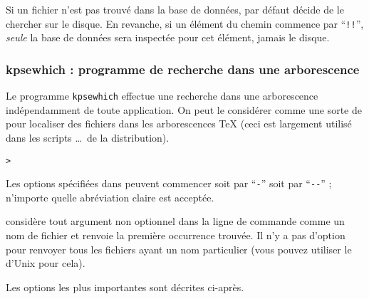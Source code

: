 \documentclass[german, english, french]{article}
\renewcommand{\samp}[1]{\enquote{\texttt{#1}}}
\begin{document}
Si un fichier n'est pas trouvé dans la base de données, par défaut \KPS{} décide
de le chercher sur le disque. En revanche, si un élément du chemin commence par
\samp{!!}, \emph{seule} la base de données sera inspectée pour cet élément,
jamais le disque.

\subsubsection{kpsewhich : programme de recherche dans une arborescence}
\label{sec:invoking-kpsewhich}

Le programme \texttt{kpsewhich} effectue une recherche dans une arborescence
indépendamment de toute application. On peut le considérer comme une sorte de
 pour localiser des fichiers dans les arborescences \TeX{} (ceci est
largement utilisé dans les scripts \dots\ de la distribution).

\begin{alltt}
> 
\end{alltt}
Les options spécifiées dans  peuvent commencer soit par \samp{-}
soit par \samp{-{}-} ; n'importe quelle abréviation claire est acceptée.

\KPS{} considère tout argument non optionnel dans la ligne de commande comme un
nom de fichier et renvoie la première occurrence trouvée. Il n'y a pas d'option
pour renvoyer tous les fichiers ayant un nom particulier (vous pouvez utiliser
le  d'Unix pour cela).

Les options les plus importantes sont décrites ci-après.
\end{document}
